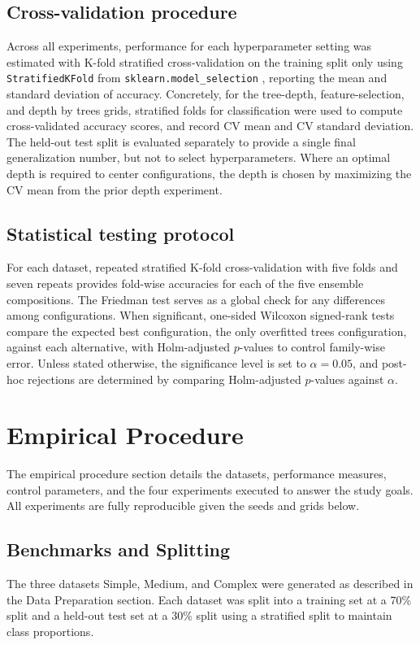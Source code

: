 \documentclass[conference]{IEEEtran}
\begin{document}
\subsection{Cross-validation procedure}
Across all experiments, performance for each hyperparameter setting was estimated with K-fold stratified cross-validation on the training split only using \texttt{StratifiedKFold} from \texttt{sklearn.model\_selection} \cite{scikit-learn}, 
reporting the mean and standard deviation of accuracy. Concretely, for the tree-depth, feature-selection, and depth by trees grids, stratified folds for classification were used to compute cross-validated accuracy scores, and record CV mean and CV standard deviation. The held-out test split is evaluated separately to provide a single final generalization number, but not to select hyperparameters. Where an optimal depth is required to center configurations, the depth is chosen by maximizing the CV mean from the prior depth experiment.

\subsection{Statistical testing protocol}
For each dataset, repeated stratified K-fold cross-validation with five folds and seven repeats provides fold-wise accuracies for each of the five ensemble compositions. The Friedman test serves as a global check for any differences among configurations. When significant, one-sided Wilcoxon signed-rank tests compare the expected best configuration, the only overfitted trees configuration, against each alternative, with Holm-adjusted $p$-values to control family-wise error. Unless stated otherwise, the significance level is set to $\alpha=0.05$, and post-hoc rejections are determined by comparing Holm-adjusted $p$-values against $\alpha$.


\section{Empirical Procedure}

The empirical procedure section details the datasets, performance measures, control parameters, and the four experiments executed to answer the study goals. All experiments are fully 
reproducible given the seeds and grids below.

\subsection{Benchmarks and Splitting}
The three datasets Simple, Medium, and Complex were generated as described in the Data Preparation section. Each dataset was split into a training set at a 70\% split and a held-out test set at a 30\% split using a stratified split to maintain class proportions.
\end{document}
